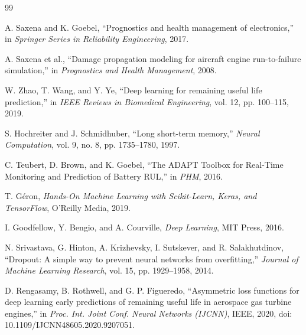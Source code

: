 \documentclass[conference]{IEEEtran}
\begin{document}
\begin{thebibliography}{99}

 A. Saxena and K. Goebel, ``Prognostics and health management of electronics,'' in \emph{Springer Series in Reliability Engineering}, 2017.

 A. Saxena et al., ``Damage propagation modeling for aircraft engine run-to-failure simulation,'' in \emph{Prognostics and Health Management}, 2008.

 W. Zhao, T. Wang, and Y. Ye, ``Deep learning for remaining useful life prediction,'' in \emph{IEEE Reviews in Biomedical Engineering}, vol. 12, pp. 100--115, 2019.

 S. Hochreiter and J. Schmidhuber, ``Long short-term memory,'' \emph{Neural Computation}, vol. 9, no. 8, pp. 1735--1780, 1997.

 C. Teubert, D. Brown, and K. Goebel, ``The ADAPT Toolbox for Real-Time Monitoring and Prediction of Battery RUL,'' in \emph{PHM}, 2016.

 T. Géron, \emph{Hands-On Machine Learning with Scikit-Learn, Keras, and TensorFlow}, O'Reilly Media, 2019.

 I. Goodfellow, Y. Bengio, and A. Courville, \emph{Deep Learning}, MIT Press, 2016.

 N. Srivastava, G. Hinton, A. Krizhevsky, I. Sutskever, and R. Salakhutdinov, ``Dropout: A simple way to prevent neural networks from overfitting,'' \emph{Journal of Machine Learning Research}, vol. 15, pp. 1929--1958, 2014.

 D. Rengasamy, B. Rothwell, and G. P. Figueredo, ``Asymmetric loss functions for deep learning early predictions of remaining useful life in aerospace gas turbine engines,'' in \emph{Proc. Int. Joint Conf. Neural Networks (IJCNN)}, IEEE, 2020, doi: 10.1109/IJCNN48605.2020.9207051.

\end{thebibliography}
\end{document}
